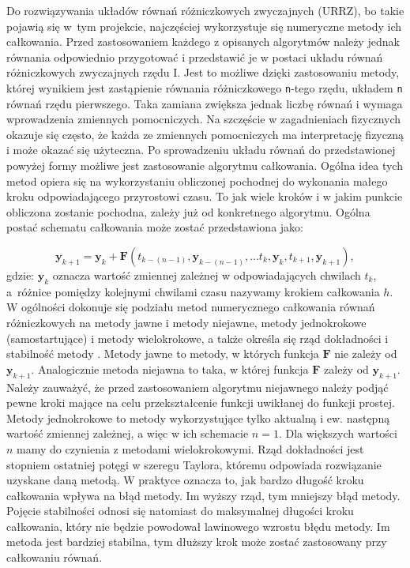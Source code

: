 Do rozwiązywania układów równań różniczkowych zwyczajnych (URRZ), bo takie pojawią się w~tym projekcie, najczęściej wykorzystuje się numeryczne metody ich całkowania. Przed zastosowaniem każdego z opisanych algorytmów należy jednak równania odpowiednio przygotować i przedstawić je w postaci układu równań różniczkowych zwyczajnych rzędu I. Jest to możliwe dzięki zastosowaniu metody, której wynikiem jest zastąpienie równania różniczkowego \texttt{n}-tego rzędu, układem \texttt{n} równań rzędu pierwszego. Taka zamiana zwiększa jednak liczbę równań i wymaga wprowadzenia zmiennych pomocniczych. Na szczęście w zagadnieniach fizycznych okazuje się często, że każda ze zmiennych pomocniczych ma interpretację fizyczną i może okazać się użyteczna. Po sprowadzeniu układu równań do przedstawionej powyżej formy możliwe jest zastosowanie algorytmu całkowania. Ogólna idea tych metod opiera się na wykorzystaniu obliczonej pochodnej do wykonania małego kroku odpowiadającego przyrostowi czasu. To jak wiele kroków i w jakim punkcie obliczona zostanie pochodna, zależy już od konkretnego algorytmu.
Ogólna postać schematu całkowania może zostać przedstawiona jako:

\[
	\bm{y}_{k+1} = \bm{y}_{k} + \bm{F} \left( t_{k-(n-1)}, \bm{y}_{k-(n-1)}, ... t_{k}, \bm{y}_{k},  t_{k+1}, \bm{y}_{k+1}  \right),
\]
gdzie: $\bm{y}_{k}$ oznacza wartość zmiennej zależnej w odpowiadających chwilach $t_{k}$, a~różnice pomiędzy kolejnymi chwilami czasu nazywamy krokiem całkowania $h$.
\\

W ogólności dokonuje się podziału metod numerycznego całkowania równań różniczkowych na metody jawne i metody niejawne, metody jednokrokowe (samostartujące) i metody wielokrokowe, a także określa się rząd dokładności i stabilność metody \cite{met_num_szum}. Metody jawne to metody, w których funkcja $\bm{F}$ nie zależy od $\bm{y}_{k+1}$. Analogicznie metoda niejawna to taka, w której funkcja $\bm{F}$ zależy od $\bm{y}_{k+1}$. Należy zauważyć, że przed zastosowaniem algorytmu niejawnego należy podjąć pewne kroki mające na celu przekształcenie funkcji uwikłanej do funkcji prostej. Metody jednokrokowe to metody wykorzystujące tylko aktualną i ew. następną wartość zmiennej zależnej, a więc w ich schemacie $n = 1$. Dla większych wartości $n$ mamy do czynienia z metodami wielokrokowymi. Rząd dokładności jest stopniem ostatniej potęgi w szeregu Taylora, któremu odpowiada rozwiązanie uzyskane daną metodą. W praktyce oznacza to, jak bardzo długość kroku całkowania wpływa na błąd metody. Im wyższy rząd, tym mniejszy błąd metody. Pojęcie stabilności odnosi się natomiast do maksymalnej długości kroku całkowania, który nie będzie powodował lawinowego wzrostu błędu metody. Im metoda jest bardziej stabilna, tym dłuższy krok może zostać zastosowany przy całkowaniu równań.\\

